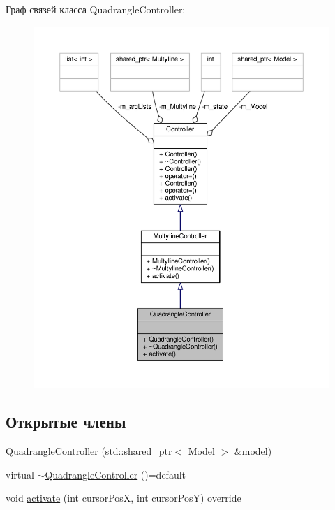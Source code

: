 Граф связей класса Quadrangle\-Controller\-:
\nopagebreak
\begin{figure}[H]
\begin{center}
\leavevmode
\includegraphics[width=350pt]{class_quadrangle_controller__coll__graph}
\end{center}
\end{figure}
\subsection*{Открытые члены}
\begin{DoxyCompactItemize}
\item 
\hyperlink{class_quadrangle_controller_a36a3a0fdae528a6ad785a22563eff2a0}{Quadrangle\-Controller} (std\-::shared\-\_\-ptr$<$ \hyperlink{class_model}{Model} $>$ \&model)
\item 
virtual \hyperlink{class_quadrangle_controller_a2c8f69d0c8f1e740e06fd9d754f30a99}{$\sim$\-Quadrangle\-Controller} ()=default
\item 
void \hyperlink{class_quadrangle_controller_a2a38c3afba85014f27041e002cfc7950}{activate} (int cursor\-Pos\-X, int cursor\-Pos\-Y) override
\end{DoxyCompactItemize}


